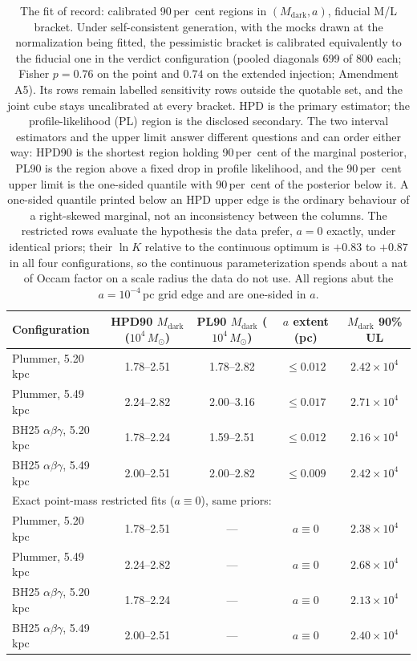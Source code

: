 \documentclass[11pt]{article}
\newcommand{\msun}{\ensuremath{M_\odot}}
\newcommand{\mdark}{\ensuremath{M_{\mathrm{dark}}}}
\newcommand{\lnK}{\ensuremath{\ln K}}
\begin{document}
\begin{table}[tbp]
\centering
\small
\caption{The fit of record: calibrated 90\,per~cent regions in $(\mdark, a)$, fiducial M/L bracket.
Under self-consistent generation, with the mocks drawn at the normalization being fitted, the
pessimistic bracket is calibrated equivalently to the fiducial one in the verdict configuration
(pooled diagonals 699 of 800 each; Fisher $p = 0.76$ on the point and $0.74$ on the extended
injection; Amendment A5). Its rows remain labelled sensitivity rows outside the quotable set, and
the joint cube stays uncalibrated at every bracket. HPD is the primary estimator; the
profile-likelihood (PL) region is the disclosed secondary. The two interval estimators and the
upper limit answer different questions and can order either way: HPD90 is the shortest region
holding 90\,per~cent of the marginal posterior, PL90 is the region above a fixed drop in profile
likelihood, and the 90\,per~cent upper limit is the one-sided quantile with 90\,per~cent of the
posterior below it. A one-sided quantile printed below an HPD upper edge is the ordinary behaviour
of a right-skewed marginal, not an inconsistency between the columns. The restricted rows evaluate the hypothesis the data prefer, $a = 0$ exactly, under identical priors; their $\lnK$ relative to the continuous optimum is $+0.83$ to $+0.87$ in all four configurations, so the continuous parameterization spends about a nat of Occam factor on a scale radius the data do not use. All regions abut the $a = 10^{-4}$\,pc
grid edge and are one-sided in $a$.}
\label{tab:regions}
\begin{tabular}{lcccc}
\toprule
Configuration & HPD90 $\mdark$ ($10^{4}\,\msun$) & PL90 $\mdark$ ($10^{4}\,\msun$) & $a$ extent (pc) & $\mdark$ 90\% UL \\
\midrule
Plummer, 5.20\,kpc & 1.78--2.51 & 1.78--2.82 & $\leq 0.012$ & $2.42\times10^{4}$ \\
Plummer, 5.49\,kpc & 2.24--2.82 & 2.00--3.16 & $\leq 0.017$ & $2.71\times10^{4}$ \\
BH25 $\alpha\beta\gamma$, 5.20\,kpc & 1.78--2.24 & 1.59--2.51 & $\leq 0.012$ & $2.16\times10^{4}$ \\
BH25 $\alpha\beta\gamma$, 5.49\,kpc & 2.00--2.51 & 2.00--2.82 & $\leq 0.009$ & $2.42\times10^{4}$ \\
\midrule
\multicolumn{5}{l}{Exact point-mass restricted fits ($a \equiv 0$), same priors:} \\
Plummer, 5.20\,kpc & 1.78--2.51 & --- & $a \equiv 0$ & $2.38\times10^{4}$ \\
Plummer, 5.49\,kpc & 2.24--2.82 & --- & $a \equiv 0$ & $2.68\times10^{4}$ \\
BH25 $\alpha\beta\gamma$, 5.20\,kpc & 1.78--2.24 & --- & $a \equiv 0$ & $2.13\times10^{4}$ \\
BH25 $\alpha\beta\gamma$, 5.49\,kpc & 2.00--2.51 & --- & $a \equiv 0$ & $2.40\times10^{4}$ \\
\bottomrule
\end{tabular}
\end{table}
\end{document}
